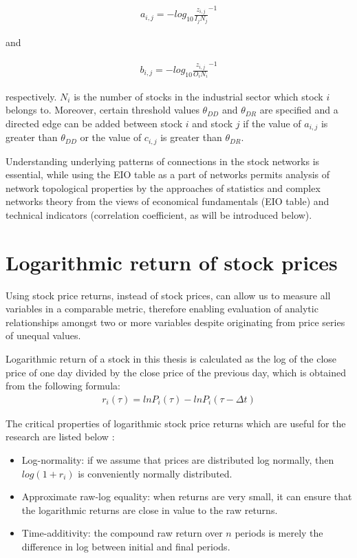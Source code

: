 \begin{eqnarray}\label{equ:eio_i}
a_{i,j} = -log_{10}{\frac{z_{i,j}}{I_j N_j}}^{-1}
\end{eqnarray}

and

\begin{eqnarray}\label{equ:eio_o}
b_{i,j} = -log_{10}{\frac{z_{i,j}}{O_i N_i}}^{-1}
\end{eqnarray}

respectively. $N_i$ is the number of stocks in the industrial sector which stock $i$ belongs to. Moreover, certain threshold values $\theta_{DD}$ and $\theta_{DR}$ are specified and a directed edge can be added between stock $i$ and stock $j$ if the value of $a_{i,j}$ is greater than $\theta_{DD}$ or the value of $c_{i,j}$ is greater than $\theta_{DR}$.

Understanding underlying patterns of connections in the stock networks is essential, while using the EIO table as a part of networks permits analysis of network topological properties by the approaches of statistics and complex networks theory from the views of economical fundamentals (EIO table) and technical indicators (correlation coefficient, as will be introduced below).

\section{Logarithmic return of stock prices}
Using stock price returns, instead of stock prices, can allow us to measure all variables in a comparable metric, therefore enabling evaluation of analytic relationships amongst two or more variables despite originating from price series of unequal values.

Logarithmic return of a stock in this thesis is calculated as the log of the close price of one day divided by the close price of the previous day, which is obtained from the following formula:
\begin{eqnarray}\label{equ:log}
r_i(\tau)=lnP_i(\tau)-lnP_i(\tau-\Delta t)
\end{eqnarray}

The critical properties of logarithmic stock price returns which are useful for the research are listed below :
\begin{itemize}
	\item Log-normality: if we assume that prices are distributed log normally, then $log(1 + r_i)$ is conveniently normally distributed.
	\item Approximate raw-log equality: when returns are very small, it can ensure that the logarithmic returns are close in value to the raw returns.
	\item Time-additivity: the compound raw return over $n$ periods is merely the difference in log between initial and final periods.
\end{itemize}

